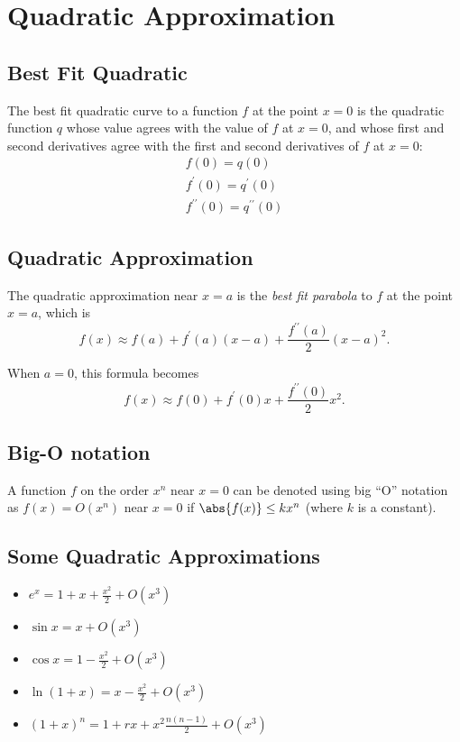 \section{Quadratic Approximation}
\subsection{Best Fit Quadratic}
The best fit quadratic curve to a function $f$ at the point $x=0$ is the quadratic function $q$ whose value agrees with the value of $f$ at $x=0$, and whose first and second derivatives agree with the first and second derivatives of $f$ at $x=0$:
\begin{gather*}
  f(0)=q(0)\\
  f^\prime (0)=q^\prime (0)\\
  f^{\prime\prime}(0)=q^{\prime\prime}(0)
\end{gather*}

\subsection{Quadratic Approximation}
The quadratic approximation near $x=a$ is the \textit{best fit parabola} to $f$ at the point $x=a$, which is 
\[f(x)\approx f(a)+f^\prime (a)(x-a)+\frac{f^{\prime\prime}(a)}{2}(x-a)^2.\]

When $a=0$, this formula becomes
\[f(x)\approx f(0)+f^\prime (0)x+\frac{f^{\prime\prime}(0)}2 x^2.\]

\subsection{Big-O notation}
A function $f$ on the order $x^n$ near $x=0$ can be denoted using big ``O'' notation as $f(x)=O(x^n)$ near $x=0$ if $\abs{f(x)}\leq kx^n$ (where $k$ is a constant).

\subsection{Some Quadratic Approximations}
\begin{itemize}
\item$e^x=1+x+\frac{x^2}2+O(x^3)$
\item$\sin x=x+O(x^3)$
\item$\cos x=1-\frac{x^2}2+O(x^3)$
\item$\ln(1+x)=x-\frac{x^2}2+O(x^3)$
\item$(1+x)^n=1+rx+x^2\frac{n(n-1)}2+O(x^3)$
\end{itemize}

